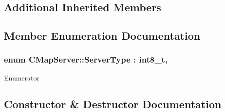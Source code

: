 \subsection*{Additional Inherited Members}


\subsection{Member Enumeration Documentation}
\subsubsection[{\texorpdfstring{Server\+Type}{ServerType}}]{\setlength{\rightskip}{0pt plus 5cm}enum {\bf C\+Map\+Server\+::\+Server\+Type} \+: {\bf int8\+\_\+t}\hspace{0.3cm}{\ttfamily [strong]}, {\ttfamily [protected]}}\hypertarget{classCMapServer_a6cfeacd7632a08bc2b12d37fb4fa3ffc}{}\label{classCMapServer_a6cfeacd7632a08bc2b12d37fb4fa3ffc}
\begin{Desc}
\item[Enumerator]\par
\begin{description}
\item[{\em 
M\+A\+S\+T\+E\+R\+\_\+\+N\+O\+DE\hypertarget{classCMapServer_a6cfeacd7632a08bc2b12d37fb4fa3ffca59c59426a33fb4498cd4e8c9cc330619}{}\label{classCMapServer_a6cfeacd7632a08bc2b12d37fb4fa3ffca59c59426a33fb4498cd4e8c9cc330619}
}]\item[{\em 
W\+O\+R\+K\+E\+R\+\_\+\+T\+H\+R\+E\+AD\hypertarget{classCMapServer_a6cfeacd7632a08bc2b12d37fb4fa3ffcaf23d8032f692800f9da91040a57ee6d9}{}\label{classCMapServer_a6cfeacd7632a08bc2b12d37fb4fa3ffcaf23d8032f692800f9da91040a57ee6d9}
}]\end{description}
\end{Desc}


\subsection{Constructor \& Destructor Documentation}
